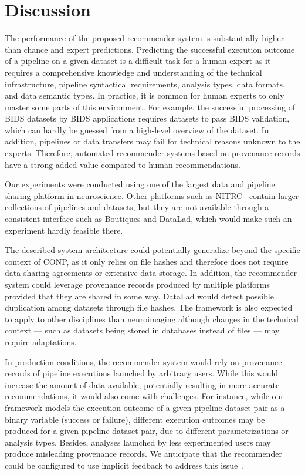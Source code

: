 \documentclass[conference]{IEEEtran}
\begin{document}
\section{Discussion}


The performance of the proposed recommender system is substantially higher
than chance and expert predictions. Predicting the successful execution
outcome of a pipeline on a given dataset is a difficult task for a human expert as it requires a comprehensive knowledge and understanding of the technical infrastructure, pipeline syntactical requirements, analysis types, data formats, and data semantic types. In practice, it is common for human experts to only master some parts of this environment. For example,
the successful processing of BIDS datasets by BIDS applications requires
datasets to pass BIDS validation, which can hardly be guessed from a
high-level overview of the dataset. 
In addition, pipelines or data
transfers may fail for technical reasons unknown to the experts. Therefore, automated
recommender systems based on provenance records have a strong added value
compared to human recommendations. 

Our experiments were conducted using one of the largest data and pipeline
sharing platform in neuroscience. Other platforms such as
NITRC~\cite{kennedy2016nitrc} contain larger collections of
pipelines and datasets, but they are not available through a consistent
interface such as Boutiques and DataLad, which would make
such an experiment hardly feasible there.

The described system architecture could potentially generalize beyond the specific
context of CONP, as it only relies on file hashes and therefore does not
require data sharing agreements or extensive data storage. In addition, the
recommender system could leverage provenance records produced by multiple
platforms provided that they are shared in some way.
DataLad would detect possible duplication among datasets through file hashes. 
The framework is also expected to apply to other disciplines than neuroimaging
although changes in the technical context --- such as datasets being stored in 
databases instead of files --- may require adaptations.

In production conditions, the recommender system would rely on provenance
records of pipeline executions launched by arbitrary users. While this would increase
the amount of data available, potentially resulting in more accurate
recommendations, it would also come with challenges. For instance, while
our framework models the execution outcome of a given pipeline-dataset pair
as a binary variable (success or failure), different execution outcomes may
be produced for a given pipeline-dataset pair, due to different
parametrizations or analysis types. Besides, analyses launched by less
experimented users may produce misleading provenance records. We anticipate
that the recommender could be configured to use implicit feedback to address 
this issue~\cite{hu2008collaborative}.
\end{document}
